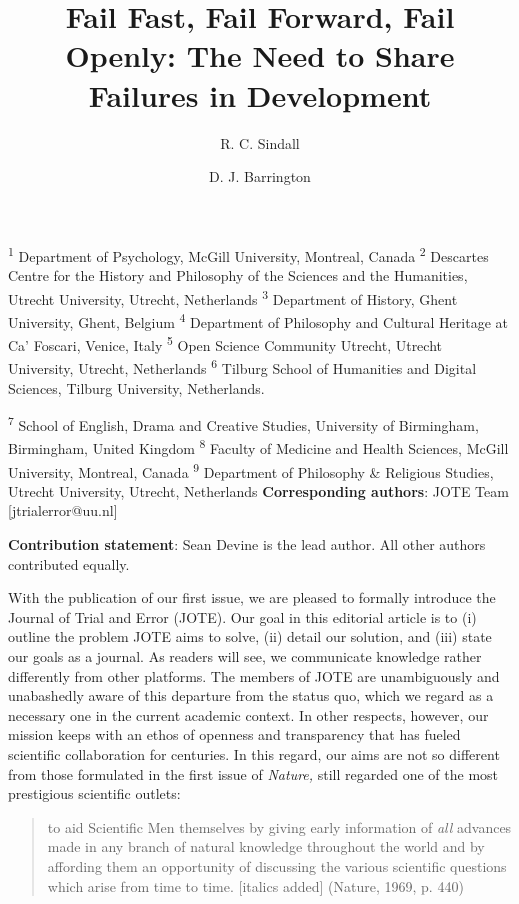 \documentclass[twocolumn, serif]{jote-article}
\title{Fail Fast, Fail Forward, Fail Openly: The Need to Share Failures in Development}
\author[1]{R. C. Sindall}
\author[2]{D. J. Barrington}
\affil[1]{Pollution Research Group, University of KwaZulu-Natal, Durban, South Africa}
\affil[2]{School of Population and Global Health, The University of Western Australia, Perth, Australia}
\begin{document}
\begin{frontmatter}
\maketitle

\end{frontmatter}
\textsuperscript{1} Department of Psychology, McGill University, Montreal, Canada 
\textsuperscript{2} Descartes Centre for the History and Philosophy of the Sciences and the Humanities, Utrecht University, Utrecht, Netherlands 
\textsuperscript{3} Department of History, Ghent University, Ghent, Belgium 
\textsuperscript{4} Department of Philosophy and Cultural Heritage at Ca' Foscari, Venice, Italy 
\textsuperscript{5} Open Science Community Utrecht, Utrecht University, Utrecht, Netherlands 
\textsuperscript{6} Tilburg School of Humanities and Digital Sciences, Tilburg University, Netherlands.

\textsuperscript{7} School of English, Drama and Creative Studies, University of Birmingham, Birmingham, United Kingdom 
\textsuperscript{8} Faculty of Medicine and Health Sciences, McGill University, Montreal, Canada 
\textsuperscript{9} Department of Philosophy \& Religious Studies, Utrecht University, Utrecht, Netherlands 
\textbf{Corresponding authors}: JOTE Team {[}jtrialerror@uu.nl{]}

\textbf{Contribution statement}: Sean Devine is the lead author. All other authors contributed equally.

With the publication of our first issue, we are pleased to formally introduce the Journal of Trial and Error (JOTE). Our goal in this editorial article is to (i) outline the problem JOTE aims to solve, (ii) detail our solution, and (iii) state our goals as a journal. As readers will see, we communicate knowledge rather differently from other platforms. The members of JOTE are unambiguously and unabashedly aware of this departure from the status quo, which we regard as a necessary one in the current academic context. In other respects, however, our mission keeps with an ethos of openness and transparency that has fueled scientific collaboration for centuries. In this regard, our aims are not so different from those formulated in the first issue of \emph{Nature,}
still regarded one of the most prestigious scientific outlets: 
\begin{quote}
to aid Scientific Men themselves by giving early information of \emph{all} advances made in any branch of natural knowledge throughout the world and by affording them an opportunity of discussing the various scientific questions which arise from time to time. {[}italics added{]}
(Nature, 1969, p. 440) \end{quote}
\end{document}
